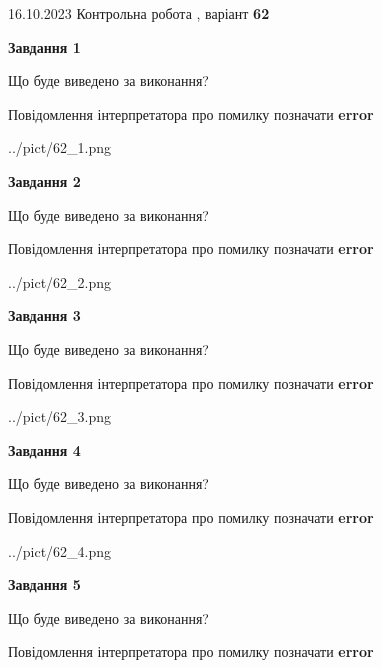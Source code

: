 \documentclass[12pt, ukrainian]{article}
\begin{document}
{\Large{16.10.2023 Контрольна робота , варіант  \No \textbf { 62 }\par}}
{
\begin {large}
{\begin {center}\textbf{Завдання 1}\end {center}}\par
Що буде виведено за виконання? \par
Повідомлення інтерпретатора про помилку позначати \textbf{error}

\begin{center}
	{../pict/62_1.png}
\end{center}
\newpage

{\begin {center}\textbf{Завдання 2}\end {center}}\par
Що буде виведено за виконання? \par
Повідомлення інтерпретатора про помилку позначати \textbf{error}

\begin{center}
	{../pict/62_2.png}
\end{center}
\newpage

{\begin {center}\textbf{Завдання 3}\end {center}}\par
Що буде виведено за виконання? \par
Повідомлення інтерпретатора про помилку позначати \textbf{error}

\begin{center}
	{../pict/62_3.png}
\end{center}
\newpage

{\begin {center}\textbf{Завдання 4}\end {center}}\par
Що буде виведено за виконання? \par
Повідомлення інтерпретатора про помилку позначати \textbf{error}

\begin{center}
	{../pict/62_4.png}
\end{center}
\newpage

{\begin {center}\textbf{Завдання 5}\end {center}}\par
Що буде виведено за виконання? \par
Повідомлення інтерпретатора про помилку позначати \textbf{error}


\end{large}}
\end{document}
